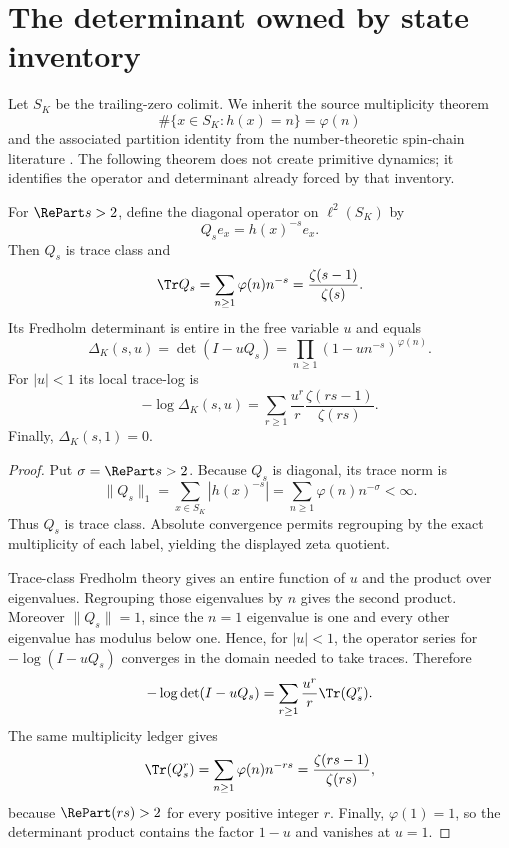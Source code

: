 \section{The determinant owned by state inventory}
\label{sec:inventory}

Let $S_K$ be the trailing-zero colimit.  We inherit the source multiplicity
theorem
\[
 \#\{x\in S_K:h(x)=n\}=\varphi(n)
\]
and the associated partition identity from the number-theoretic spin-chain
literature \citep{knauf1993phases,knauf1998spin,knauf1999erratum}.  The
following theorem does not create primitive dynamics; it identifies the
operator and determinant already forced by that inventory.

\begin{theorem}
\label{thm:inventory-determinant}
For $\RePart s>2$, define the diagonal operator on $\ell^2(S_K)$ by
\[
 Q_se_x=h(x)^{-s}e_x.
\]
Then $Q_s$ is trace class and
\[
 \Tr Q_s=\sum_{n\ge1}\varphi(n)n^{-s}
 =\frac{\zeta(s-1)}{\zeta(s)}.
\]
Its Fredholm determinant is entire in the free variable $u$ and equals
\[
 \Delta_K(s,u)=\det(I-uQ_s)
 =\prod_{n\ge1}(1-un^{-s})^{\varphi(n)}.
\]
For $|u|<1$ its local trace-log is
\[
 -\log\Delta_K(s,u)
 =\sum_{r\ge1}\frac{u^r}{r}
   \frac{\zeta(rs-1)}{\zeta(rs)}.
\]
Finally, $\Delta_K(s,1)=0$.
\end{theorem}
\begin{proof}
Put $\sigma=\RePart s>2$.  Because $Q_s$ is diagonal, its trace norm is
\[
 \lVert Q_s\rVert_1
 =\sum_{x\in S_K}|h(x)^{-s}|
 =\sum_{n\ge1}\varphi(n)n^{-\sigma}<\infty.
\]
Thus $Q_s$ is trace class.  Absolute convergence permits regrouping by the
exact multiplicity of each label, yielding the displayed zeta quotient.

Trace-class Fredholm theory gives an entire function of $u$ and the product
over eigenvalues.  Regrouping those eigenvalues by $n$ gives the second
product.  Moreover $\lVert Q_s\rVert=1$, since the $n=1$ eigenvalue is one
and every other eigenvalue has modulus below one.  Hence, for $|u|<1$, the
operator series for $-\log(I-uQ_s)$ converges in the domain needed to take
traces.  Therefore
\[
 -\log\det(I-uQ_s)
 =\sum_{r\ge1}\frac{u^r}{r}\Tr(Q_s^r).
\]
The same multiplicity ledger gives
\[
 \Tr(Q_s^r)=\sum_{n\ge1}\varphi(n)n^{-rs}
 =\frac{\zeta(rs-1)}{\zeta(rs)},
\]
because $\RePart(rs)>2$ for every positive integer $r$.  Finally,
$\varphi(1)=1$, so the determinant product contains the factor $1-u$ and
vanishes at $u=1$.
\end{proof}

